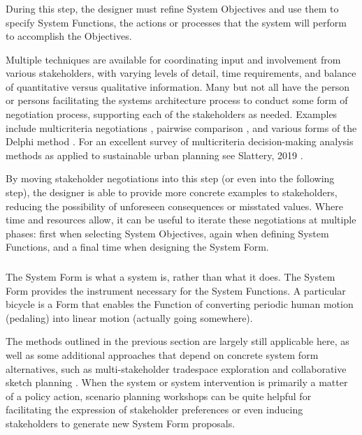 \subsubsection{}

During this step, the designer must refine System Objectives and use them to specify System Functions, the actions or processes that the system will perform to accomplish the Objectives.

Multiple techniques are available for coordinating input and involvement from various stakeholders, with varying levels of detail, time requirements, and balance of quantitative versus qualitative information. Many but not all have the person or persons facilitating the systems architecture process to conduct some form of negotiation process, supporting each of the stakeholders as needed. Examples include  multicriteria negotiations \cite{sparrevikUseMulticriteriaInvolvement2011},  pairwise comparison \cite{motieyanSustainableUrbanPlanning2017}, and various forms of the Delphi method \cite{morganUrbanPlanningUsing1979}. For an excellent survey of multicriteria decision-making analysis methods as applied to sustainable urban planning see Slattery, 2019 \cite{slatteryQuantitativeAssessmentSustainable2019}.

By moving stakeholder negotiations into this step (or even into the following step), the designer is able to provide more concrete examples to stakeholders, reducing the possibility of unforeseen consequences or misstated values. Where time and resources allow, it can be useful to iterate these negotiations at multiple phases: first when selecting System Objectives, again when defining System Functions, and a final time when designing the System Form.


\subsubsection{} \label{sec:saf-assign}

The System Form is what a system is, rather than what it does. The System Form provides the instrument necessary for the System Functions. A particular bicycle is a Form that enables the Function of converting periodic human motion (pedaling) into linear motion (actually going somewhere).

The methods outlined in the previous section are largely still applicable here, as well as some additional approaches that depend on concrete system form alternatives, such as multi-stakeholder tradespace exploration \cite{fitzgeraldRecommendationsFramingMultistakeholder2016} and collaborative sketch planning \cite{vonkSociotechnicalPSSDevelopment2010}. When the system or system intervention is primarily a matter of a policy action, scenario planning workshops can be quite helpful for facilitating the expression of stakeholder preferences or even inducing stakeholders to generate new System Form proposals.

